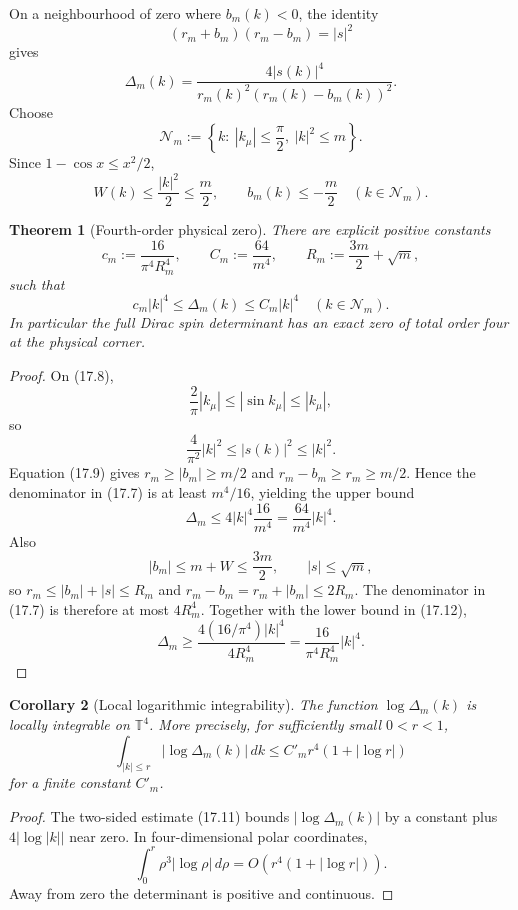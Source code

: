\documentclass[11pt]{article}
\newtheorem{theorem}{Theorem}[section]
\newtheorem{corollary}[theorem]{Corollary}
\begin{document}
On a neighbourhood of zero where \(b_m(k)<0\), the identity
\[
 (r_m+b_m)(r_m-b_m)=|s|^2
 \tag{17.6}
\]
gives
\[
 \Delta_m(k)
 =
 \frac{4|s(k)|^4}
 {r_m(k)^2(r_m(k)-b_m(k))^2}.
 \tag{17.7}
\]
Choose
\[
 \mathcal N_m:=
 \left\{
 k:\ |k_\mu|\leq\frac{\pi}{2},\
 |k|^2\leq m
 \right\}.
 \tag{17.8}
\]
Since \(1-\cos x\leq x^2/2\),
\[
 W(k)\leq\frac{|k|^2}{2}\leq\frac m2,
 \qquad
 b_m(k)\leq-\frac m2
 \quad(k\in\mathcal N_m).
 \tag{17.9}
\]

\begin{theorem}[Fourth-order physical zero]
\label{thm:v11v17-fourth-order}
There are explicit positive constants
\[
 c_m:=\frac{16}{\pi^4R_m^4},
 \qquad
 C_m:=\frac{64}{m^4},
 \qquad
 R_m:=\frac{3m}{2}+\sqrt m,
 \tag{17.10}
\]
such that
\[
 c_m|k|^4
 \leq
 \Delta_m(k)
 \leq
 C_m|k|^4
 \quad(k\in\mathcal N_m).
 \tag{17.11}
\]
In particular the full Dirac spin determinant has an exact zero of total
order four at the physical corner.
\end{theorem}

\begin{proof}
On (17.8),
\[
 \frac{2}{\pi}|k_\mu|
 \leq|\sin k_\mu|\leq|k_\mu|,
\]
so
\[
 \frac4{\pi^2}|k|^2\leq|s(k)|^2\leq|k|^2.
 \tag{17.12}
\]
Equation (17.9) gives \(r_m\geq|b_m|\geq m/2\) and
\(r_m-b_m\geq r_m\geq m/2\).  Hence the denominator in (17.7) is at least
\(m^4/16\), yielding the upper bound
\[
 \Delta_m\leq4|k|^4\frac{16}{m^4}
 =\frac{64}{m^4}|k|^4.
\]
Also
\[
 |b_m|\leq m+W\leq\frac{3m}{2},
 \qquad
 |s|\leq\sqrt m,
\]
so \(r_m\leq|b_m|+|s|\leq R_m\) and
\(r_m-b_m=r_m+|b_m|\leq2R_m\).  The denominator in (17.7) is therefore
at most \(4R_m^4\).  Together with the lower bound in (17.12),
\[
 \Delta_m
 \geq
 \frac{4(16/\pi^4)|k|^4}{4R_m^4}
 =
 \frac{16}{\pi^4R_m^4}|k|^4.
\]
\end{proof}

\begin{corollary}[Local logarithmic integrability]
\label{cor:v11v17-log-integrable}
The function \(\log\Delta_m(k)\) is locally integrable on
\(\mathbb T^4\).  More precisely, for sufficiently small
\(0<r<1\),
\[
 \int_{|k|\leq r}|\log\Delta_m(k)|\,dk
 \leq
 C'_m r^4(1+|\log r|)
 \tag{17.13}
\]
for a finite constant \(C'_m\).
\end{corollary}

\begin{proof}
The two-sided estimate (17.11) bounds
\(|\log\Delta_m(k)|\) by a constant plus \(4|\log|k||\) near zero.
In four-dimensional polar coordinates,
\[
 \int_0^r \rho^3|\log\rho|\,d\rho
 =
 O(r^4(1+|\log r|)).
\]
Away from zero the determinant is positive and continuous.
\end{proof}
\end{document}
